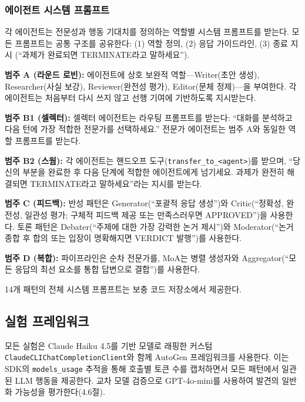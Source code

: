 \documentclass[a4paper,11pt]{article}
\begin{document}
\subsubsection{에이전트 시스템 프롬프트}

각 에이전트는 전문성과 행동 기대치를 정의하는 역할별 시스템 프롬프트를 받는다. 모든 프롬프트는 공통 구조를 공유한다: (1) 역할 정의, (2) 응답 가이드라인, (3) 종료 지시 (``과제가 완료되면 TERMINATE라고 말하세요'').

\textbf{범주 A (라운드 로빈):} 에이전트에 상호 보완적 역할---Writer(초안 생성), Researcher(사실 보강), Reviewer(완전성 평가), Editor(문체 정제)---을 부여한다. 각 에이전트는 처음부터 다시 쓰지 않고 선행 기여에 기반하도록 지시받는다.

\textbf{범주 B1 (셀렉터):} 셀렉터 에이전트는 라우팅 프롬프트를 받는다: ``대화를 분석하고 다음 턴에 가장 적합한 전문가를 선택하세요.'' 전문가 에이전트는 범주 A와 동일한 역할 프롬프트를 받는다.

\textbf{범주 B2 (스웜):} 각 에이전트는 핸드오프 도구(\texttt{transfer\_to\_<agent>})를 받으며, ``당신의 부분을 완료한 후 다음 단계에 적합한 에이전트에게 넘기세요. 과제가 완전히 해결되면 TERMINATE라고 말하세요''라는 지시를 받는다.

\textbf{범주 C (피드백):} 반성 패턴은 Generator(``포괄적 응답 생성'')와 Critic(``정확성, 완전성, 일관성 평가; 구체적 피드백 제공 또는 만족스러우면 APPROVED'')을 사용한다. 토론 패턴은 Debater(``주제에 대한 가장 강력한 논거 제시'')와 Moderator(``논거 종합 후 합의 또는 입장이 명확해지면 VERDICT 발행'')를 사용한다.

\textbf{범주 D (복합):} 파이프라인은 순차 전문가를, MoA는 병렬 생성자와 Aggregator(``모든 응답의 최선 요소를 통합 답변으로 결합'')를 사용한다.

14개 패턴의 전체 시스템 프롬프트는 보충 코드 저장소에서 제공한다.

\subsection{실험 프레임워크}

모든 실험은 Claude Haiku 4.5를 기반 모델로 래핑한 커스텀 \texttt{ClaudeCLIChatCompletionClient}와 함께 AutoGen 프레임워크를 사용한다. 이는 SDK의 \texttt{models\_usage} 추적을 통해 호출별 토큰 수를 캡처하면서 모든 패턴에서 일관된 LLM 행동을 제공한다. 교차 모델 검증으로 GPT-4o-mini를 사용하여 발견의 일반화 가능성을 평가한다(4.6절).
\end{document}
